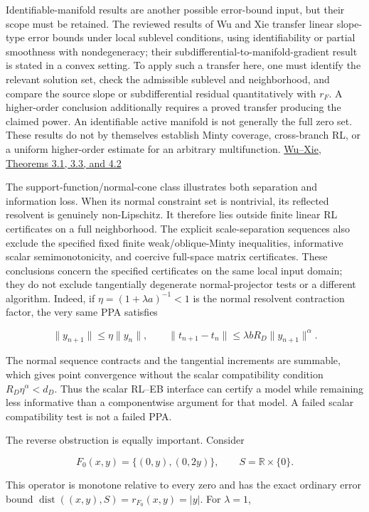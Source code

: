 \documentclass[11pt,a4paper]{article}
\theoremstyle{plain}
\theoremstyle{definition}
\theoremstyle{remark}
\begin{document}
Identifiable-manifold results are another possible error-bound input,
but their scope must be retained. The reviewed results of Wu and Xie
transfer linear slope-type error bounds under local sublevel conditions,
using identifiability or partial smoothness with nondegeneracy; their
subdifferential-to-manifold-gradient result is stated in a convex
setting. To apply such a transfer here, one must identify the relevant
solution set, check the admissible sublevel and neighborhood, and
compare the source slope or subdifferential residual quantitatively with
\(r_F\). A higher-order conclusion additionally requires a proved
transfer producing the claimed power. An identifiable active manifold is
not generally the full zero set. These results do not by themselves
establish Minty coverage, cross-branch RL, or a uniform higher-order
estimate for an arbitrary multifunction.
\href{https://arxiv.org/html/2605.02754v2}{Wu--Xie, Theorems 3.1, 3.3,
and 4.2}

The support-function/normal-cone class illustrates both separation and
information loss. When its normal constraint set is nontrivial, its
reflected resolvent is genuinely non-Lipschitz. It therefore lies
outside finite linear RL certificates on a full neighborhood. The
explicit scale-separation sequences also exclude the specified fixed
finite weak/oblique-Minty inequalities, informative scalar
semimonotonicity, and coercive full-space matrix certificates. These
conclusions concern the specified certificates on the same local input
domain; they do not exclude tangentially degenerate normal-projector
tests or a different algorithm. Indeed, if \(\eta=(1+\lambda a)^{-1}<1\)
is the normal resolvent contraction factor, the very same PPA satisfies

\[
\|y_{n+1}\|\le \eta\|y_n\|,
\qquad
\|t_{n+1}-t_n\|\le\lambda bR_D\|y_{n+1}\|^\alpha.
\]

The normal sequence contracts and the tangential increments are
summable, which gives point convergence without the scalar compatibility
condition \(R_D\eta^\alpha<d_D\). Thus the scalar RL--EB interface can
certify a model while remaining less informative than a componentwise
argument for that model. A failed scalar compatibility test is not a
failed PPA.

The reverse obstruction is equally important. Consider

\[
F_0(x,y)=\{(0,y),(0,2y)\},\qquad S=\mathbb R\times\{0\}.
\]

This operator is monotone relative to every zero and has the exact
ordinary error bound \(\operatorname{dist}((x,y),S)=r_{F_0}(x,y)=|y|\).
For \(\lambda=1\),
\end{document}
